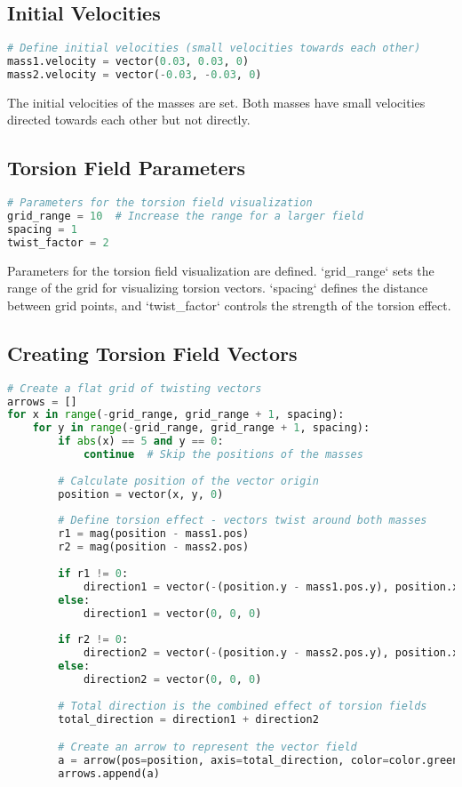 \documentclass{article}
\begin{document}
\subsection{Initial Velocities}
\begin{lstlisting}[language=Python, breaklines=true]
# Define initial velocities (small velocities towards each other)
mass1.velocity = vector(0.03, 0.03, 0)
mass2.velocity = vector(-0.03, -0.03, 0)
\end{lstlisting}

The initial velocities of the masses are set. Both masses have small velocities directed towards each other but not directly.

\subsection{Torsion Field Parameters}
\begin{lstlisting}[language=Python, breaklines=true]
# Parameters for the torsion field visualization
grid_range = 10  # Increase the range for a larger field
spacing = 1
twist_factor = 2
\end{lstlisting}

Parameters for the torsion field visualization are defined. `grid_range` sets the range of the grid for visualizing torsion vectors. `spacing` defines the distance between grid points, and `twist_factor` controls the strength of the torsion effect.

\subsection{Creating Torsion Field Vectors}
\begin{lstlisting}[language=Python, breaklines=true]
# Create a flat grid of twisting vectors
arrows = []
for x in range(-grid_range, grid_range + 1, spacing):
    for y in range(-grid_range, grid_range + 1, spacing):
        if abs(x) == 5 and y == 0:
            continue  # Skip the positions of the masses
        
        # Calculate position of the vector origin
        position = vector(x, y, 0)
        
        # Define torsion effect - vectors twist around both masses
        r1 = mag(position - mass1.pos)
        r2 = mag(position - mass2.pos)
        
        if r1 != 0:
            direction1 = vector(-(position.y - mass1.pos.y), position.x - mass1.pos.x, 0) * (twist_factor / (r1 ** 2 + 1))
        else:
            direction1 = vector(0, 0, 0)
        
        if r2 != 0:
            direction2 = vector(-(position.y - mass2.pos.y), position.x - mass2.pos.x, 0) * (twist_factor / (r2 ** 2 + 1))
        else:
            direction2 = vector(0, 0, 0)
        
        # Total direction is the combined effect of torsion fields
        total_direction = direction1 + direction2

        # Create an arrow to represent the vector field
        a = arrow(pos=position, axis=total_direction, color=color.green)
        arrows.append(a)
\end{lstlisting}
\end{document}
